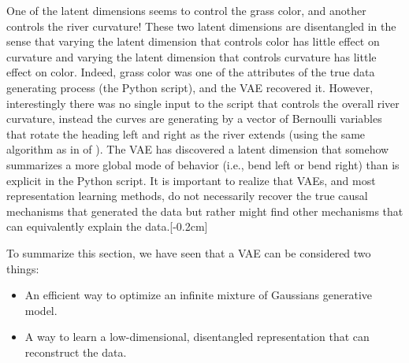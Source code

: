 One of the latent dimensions seems to control the grass color, and another controls the river curvature! These two latent dimensions are disentangled in the sense that varying the latent dimension that controls color has little effect on curvature and varying the latent dimension that controls curvature has little effect on color. Indeed, grass color was one of the attributes of the true data generating process (the Python script), and the VAE recovered it. However, interestingly there was no single input to the script that controls the overall river curvature, instead the curves are generating by a vector of Bernoulli variables that rotate the heading left and right as the river extends (using the same algorithm as in \algref{\ref{alg:generative_models:simple_rivers_script}} of \chap{\ref{chapter:generative_models}}). The VAE has discovered a latent dimension that somehow summarizes a more global mode of behavior (i.e., bend left or bend right) than is explicit in the Python script. It is important to realize that VAEs, and most representation learning methods, do not necessarily recover the true causal mechanisms that generated the data but rather might find other mechanisms that can equivalently explain the data.[-0.2cm]

To summarize this section, we have seen that a VAE can be considered two things:
\begin{itemize}
    \item An efficient way to optimize an infinite mixture of Gaussians generative model.
    \item A way to learn a low-dimensional, disentangled representation that can reconstruct the data.
\end{itemize}






